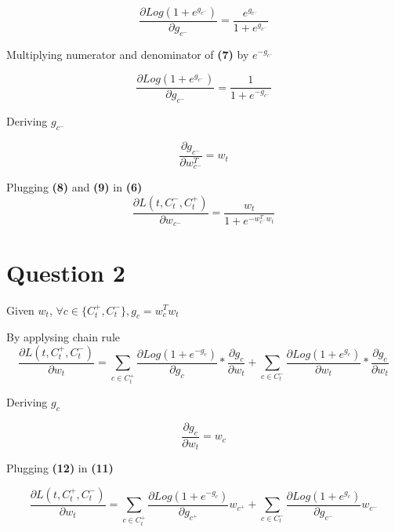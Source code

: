 \documentclass[a4paper]{article}
\begin{document}
\begin{equation}
\frac{\partial Log(1 + e^{g_{c^{-}}})}{\partial g_{c^{-}}}
= \frac{e^{ g_{c^{-}}}}{1+e^{g_{c^{-}}}}
\end{equation}


Multiplying numerator and denominator of \textbf{(7)} by $e^{-g_{c^{-}}}$

\begin{equation}
    \frac{\partial Log(1 + e^{g_{c^{-}}})}{\partial g_{c^{-}}}= \frac{1}{1 + e^{-g_{c^{-}}}}
\end{equation}

Deriving $g_{c^{-}}$

\begin{equation}
\frac{\partial g_{c^{-}}}{\partial w_{c^{-}}^{T}}=w_{t}
\end{equation}

Plugging \textbf{(8)} and \textbf{(9)} in \textbf{(6)}
\begin{equation}
\boxed{
\frac{\partial L(t, C_{t}^{-},C_{t}^{+})}{\partial w_{c^{-}}}=\frac{w_{t}}{1 + e^{-w_{c^{-}}^{T}w_{t}}}
}
\end{equation}

 
\section{Question 2}
Given $w_{t}$,  $\forall c \in \{C_{t}^{+}, C_{t}^{-}\}, g_{c}=w_{c}^{T}w_{t}$

By applysing chain rule
\begin{equation}
\frac{\partial L(t, C_{t}^{+},C_{t}^{-})}{\partial w_{t}} =
\sum_{c \in C_{t}^{+}}
\frac{\partial Log(1+ e^{-g_{c}})}{\partial g_{c}}
*
\frac{\partial g_{c}}{\partial w_{t}}
+
\sum_{c \in C_{t}^{-}}
\frac{\partial Log(1+ e^{g_{c}})}{\partial w_{t}}
*
\frac{\partial g_{c}}{\partial w_{t}}
\end{equation}

Deriving $g_{c}$

\begin{equation}
\frac{\partial g_{c}}{\partial w_{t}}=w_{c}
\end{equation}


Plugging \textbf{(12)} in \textbf{(11)}

\begin{equation}
\frac{\partial L(t, C_{t}^{+},C_{t}^{-})}{\partial w_{t}} =
\sum_{c \in C_{t}^{+}}
\frac{\partial Log(1+ e^{-g_{c}})}{\partial g_{c^{+}}}
w_{c^{+}}
+
\sum_{c \in C_{t}^{-}}
\frac{\partial Log(1+ e^{g_{c}})}{\partial g_{c^{-}}}
w_{c^{-}}
\end{equation}
\end{document}
